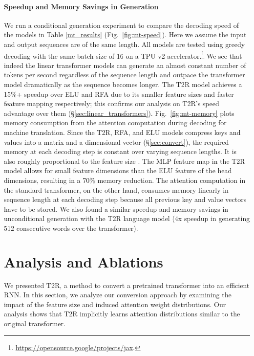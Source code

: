 \documentclass[11pt]{article}
\newcommand{\TRNN}{T2R\xspace}
\begin{document}
\paragraph{Speedup and Memory Savings in Generation}
We run a conditional generation experiment to compare the decoding speed of the models in Table \ref{mt_results} (Fig.\ \ref{fig:mt-speed}).
Here we assume the input and output sequences are of the same length.
All models are tested using greedy decoding with the same batch size of 16 on a TPU v2 accelerator.\footnote{\url{https://opensource.google/projects/jax}.}
We see that indeed the linear transformer models can generate an almost constant number of tokens per second regardless of the sequence length and outpace the transformer model dramatically as the sequence becomes longer.
The \TRNN model achieves a 15\%+ speedup over ELU and RFA due to its smaller feature sizes and faster feature mapping respectively; this confirms our analysis on \TRNN's speed advantage over them (\S\ref{sec:linear_transformers}).
Fig.\ \ref{fig:mt-memory} plots memory consumption from the attention computation during decoding for machine translation. Since the \TRNN, RFA, and ELU models compress keys and values into a  matrix  and a  dimensional vector  (\S\ref{sec:convert}), the required memory at each decoding step is constant over varying sequence lengths.
It is also roughly proportional to the feature size . The MLP feature map in the \TRNN model allows for small feature dimensions than the ELU feature of the head dimensions, resulting in a 70\% memory reduction.
The attention computation in the standard transformer, on the other hand, consumes memory linearly in sequence length at each decoding step because all previous key and value vectors have to be stored.
We also found a similar speedup and memory savings in unconditional generation with the \TRNN language model (4x speedup in generating 512 consecutive words over the transformer).


\section{Analysis and Ablations}
We presented \TRNN, a method to convert a pretrained transformer into an efficient RNN.
In this section, we analyze our conversion approach by examining the impact of the feature size and induced attention weight distributions.
Our analysis shows that \TRNN implicitly learns attention distributions similar to the original transformer.
\end{document}
